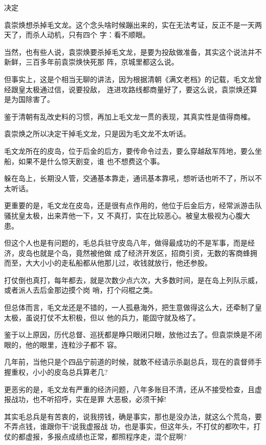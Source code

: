 \documentclass[11pt,a4paper,onecolumn]{article}
\begin{document}
决定

袁崇焕想杀掉毛文龙。这个念头啥时候蹦出来的，实在无法考证，反正不是一天两天了，而杀人动机，只有四个
字：看不顺眼。

当然，也有些人说，袁崇焕要杀掉毛文龙，是要为投敌做准备，其实这个说法并不新鲜，三百多年前袁崇焕快死那
阵，京城里都这么说。

但事实上，这是个相当无聊的讲法，因为根据清朝《满文老档》的记载，毛文龙曾经跟皇太极通过信，说要投敌，
连进攻路线都商量好了，要这么说，袁崇焕还算是为国除害了。

鉴于清朝有乱改史料的习惯，再加上毛文龙一贯的表现，其真实性是值得商榷。

袁崇焕之所以决定干掉毛文龙，只是因为毛文龙不太听话。

毛文龙所在的皮岛，位于后金的后方，要传命令过去，要么穿越敌军阵地，要么坐船，如果不是什么惊天剧变，谁
也不想费这个事。

躲在岛上，长期没人管，交通基本靠走，通讯基本靠吼，想听话也听不了，所以不太听话。

更重要的是，毛文龙在皮岛，还是很有点作用的，他位于后金后方，经常派游击队骚扰皇太极，出来弄他一下，又
不真打，实在比较恶心。被皇太极视为心腹大患。

但这个人也是有问题的，毛总兵驻守皮岛八年，做得最成功的不是军事，而是经济，皮岛也就是个岛，竟然被他做
成了经济开发区，招商引资，无数的客商蜂拥而至，大大小小的走私船都从他那儿过，收钱就放行，他还参股。

打仗倒也真打，每年都去，就是次数少点\myrule 六次，大多数时间，是在岛上列队示威，或者派人去后金那边摸个岗
哨，打个闷棍之类。

但总体而言，毛文龙还是不错的，一人孤悬海外，把生意做得这么大，还牵制了皇太极，虽说打仗不太积极，但以
他的兵力，能固守就及格了。

鉴于以上原因，历代总督、巡抚都是睁只眼闭只眼，放他过去了。但袁崇焕是不闭眼的，他的眼里，连粒沙子都不
容。

几年前，当他只是个四品宁前道的时候，就敢不经请示杀副总兵，现在的袁督师手握重权，小小的皮岛总兵算老几?

更恶劣的是，毛文龙有严重的经济问题，八年多账目不清，还从不接受检查，且虚报战功，也不听招呼，实在是罪
大恶极，必须干掉!

其实毛总兵是有苦衷的，说我捞钱，确是事实，那也是没办法，就这么个荒岛，要不弄点钱，谁跟你干?说我虚报战
功，也是事实，但这年头，不打仗的都吹牛，打仗的都虚报，多报点成绩也正常，都照程序走，混个屁啊?

\section[\thesection]{}
\end{document}

